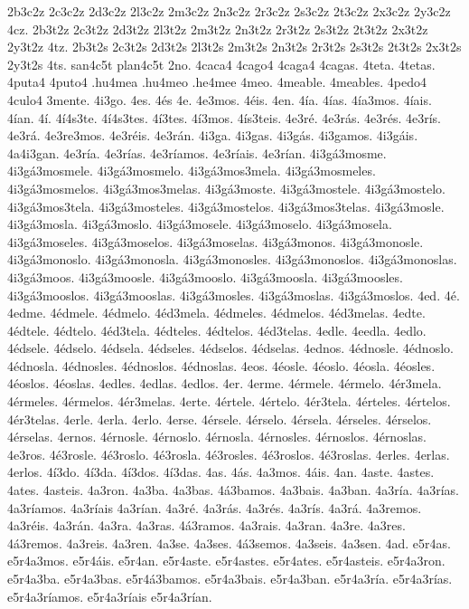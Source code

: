{2b3c2z 2c3c2z 2d3c2z 2l3c2z 2m3c2z 2n3c2z 2r3c2z 2s3c2z 2t3c2z 2x3c2z 2y3c2z 4cz.
2b3t2z 2c3t2z 2d3t2z 2l3t2z 2m3t2z 2n3t2z 2r3t2z 2s3t2z 2t3t2z 2x3t2z 2y3t2z 4tz.
2b3t2s 2c3t2s 2d3t2s 2l3t2s 2m3t2s 2n3t2s 2r3t2s 2s3t2s 2t3t2s 2x3t2s 2y3t2s 4ts.
san4c5t
plan4c5t
2no.
4caca4 4cago4 4caga4 4cagas. 4teta. 4tetas. 4puta4 4puto4 .hu4mea .hu4meo .he4mee
4meo. 4meable. 4meables. 4pedo4 4culo4
3mente.
4i3go. 4es. 4és 4e. 4e3mos. 4éis. 4en.
4ía. 4ías. 4ía3mos. 4íais. 4ían.
4í. 4í4s3te. 4í4s3tes. 4í3tes. 4í3mos. 4ís3teis.
4e3ré. 4e3rás. 4e3rés. 4e3rís. 4e3rá. 4e3re3mos. 4e3réis. 4e3rán.
4i3ga. 4i3gas. 4i3gás. 4i3gamos. 4i3gáis. 4a4i3gan.
4e3ría. 4e3rías. 4e3ríamos. 4e3ríais. 4e3rían.
4i3gá3mosme.
4i3gá3mosmele. 4i3gá3mosmelo. 4i3gá3mos3mela.
4i3gá3mosmeles. 4i3gá3mosmelos. 4i3gá3mos3melas.
4i3gá3moste.
4i3gá3mostele. 4i3gá3mostelo. 4i3gá3mos3tela.
4i3gá3mosteles. 4i3gá3mostelos. 4i3gá3mos3telas.
4i3gá3mosle. 4i3gá3mosla. 4i3gá3moslo.
4i3gá3mosele. 4i3gá3moselo. 4i3gá3mosela.
4i3gá3moseles. 4i3gá3moselos. 4i3gá3moselas.
4i3gá3monos.
4i3gá3monosle. 4i3gá3monoslo. 4i3gá3monosla.
4i3gá3monosles. 4i3gá3monoslos. 4i3gá3monoslas.
4i3gá3moos.
4i3gá3moosle. 4i3gá3mooslo. 4i3gá3moosla.
4i3gá3moosles. 4i3gá3mooslos. 4i3gá3mooslas.
4i3gá3mosles. 4i3gá3moslas. 4i3gá3moslos.
4ed. 4é.
4edme.
4édmele. 4édmelo. 4éd3mela.
4édmeles. 4édmelos. 4éd3melas.
4edte.
4édtele. 4édtelo. 4éd3tela.
4édteles. 4édtelos. 4éd3telas.
4edle. 4eedla. 4edlo.
4édsele. 4édselo. 4édsela.
4édseles. 4édselos. 4édselas.
4ednos.
4édnosle. 4édnoslo. 4édnosla.
4édnosles. 4édnoslos. 4édnoslas.
4eos.
4éosle. 4éoslo. 4éosla.
4éosles. 4éoslos. 4éoslas.
4edles. 4edlas. 4edlos.
4er.
4erme.
4érmele. 4érmelo. 4ér3mela.
4érmeles. 4érmelos. 4ér3melas.
4erte.
4értele. 4értelo. 4ér3tela.
4érteles. 4értelos. 4ér3telas.
4erle. 4erla. 4erlo.
4erse.
4érsele. 4érselo. 4érsela.
4érseles. 4érselos. 4érselas.
4ernos.
4érnosle. 4érnoslo. 4érnosla.
4érnosles. 4érnoslos. 4érnoslas.
4e3ros.
4é3rosle. 4é3roslo. 4é3rosla.
4é3rosles. 4é3roslos. 4é3roslas.
4erles. 4erlas. 4erlos.
4í3do. 4í3da. 4í3dos. 4í3das.
4as. 4ás. 4a3mos. 4áis. 4an.
4aste. 4astes. 4ates. 4asteis. 4a3ron.
4a3ba. 4a3bas. 4á3bamos. 4a3bais. 4a3ban.
4a3ría. 4a3rías. 4a3ríamos. 4a3ríais 4a3rían.
4a3ré. 4a3rás. 4a3rés. 4a3rís. 4a3rá. 4a3remos. 4a3réis. 4a3rán.
4a3ra. 4a3ras. 4á3ramos. 4a3rais. 4a3ran.
4a3re. 4a3res. 4á3remos. 4a3reis. 4a3ren.
4a3se. 4a3ses. 4á3semos. 4a3seis. 4a3sen.
4ad.
e5r4as. e5r4a3mos. e5r4áis. e5r4an.
e5r4aste. e5r4astes. e5r4ates. e5r4asteis. e5r4a3ron.
e5r4a3ba. e5r4a3bas. e5r4á3bamos. e5r4a3bais. e5r4a3ban.
e5r4a3ría. e5r4a3rías. e5r4a3ríamos. e5r4a3ríais e5r4a3rían.
}
